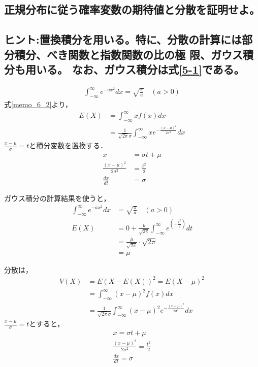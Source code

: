 \documentclass[titlepage,a4paper]{jsarticle}
\begin{document}
\subsection{正規分布に従う確率変数の期待値と分散を証明せよ。}
\subsection*{ヒント:置換積分を用いる。特に、分散の計算には部分積分、べき関数と指数関数の比の極 限、ガウス積分も用いる。
  なお、ガウス積分は式\eqref{5-1}である。}
\begin{align}
  \int_{-\infty}^\infty e^{-ax^2} dx = \sqrt{\frac{\pi}{a}} \quad (a > 0)\label{5-1}
\end{align}
式\eqref{memo_6_2}より，
\begin{align}
  E(X) & = \int_{-\infty}^\infty x f(x) dx                                                            \\
       & = \frac{1}{\sqrt{2\pi} \sigma} \int_{-\infty}^\infty x e^{-\frac{(x - \mu)^2}{2\sigma^2}} dx
\end{align}
$\frac{x - \mu}{\sigma} = t $と積分変数を置換する．
\begin{align}
  x                             & = \sigma t + \mu \\
  \frac{(x - \mu)^2}{2\sigma^2} & = \frac{t^2}{2}  \\
  \frac{dx}{dt}                 & = \sigma
\end{align}

ガウス積分の計算結果を使うと，
\begin{align}
  \int_{-\infty}^\infty e^{-ax^2} dx & = \sqrt{\frac{\pi}{a}} \quad (a > 0)                                                      \\
  E(X)                               & = 0 + \frac{\mu}{\sqrt{2\pi}} \int_{-\infty}^\infty e ^{\left( -\frac{t^2}{2} \right) }dt \\
                                     & = \frac{\mu}{\sqrt{2\pi}} \cdot \sqrt{2\pi}                                               \\
                                     & = \mu
\end{align}

分散は，
\begin{align}
  V(X) & = E(X - E(X))^2 = E(X - \mu)^2                                                                          \\
       & = \int_{-\infty}^\infty (x - \mu)^2 f(x) dx                                                             \\
       & = \frac{1}{\sqrt{2\pi} \sigma} \int_{-\infty}^\infty (x - \mu)^2 e^{-\frac{(x - \mu)^2}{2\sigma^2} } dx
\end{align}
$\frac{x - \mu}{\sigma} = t$とすると，
\begin{align}
  x = \sigma t + \mu                            \\
  \frac{(x - \mu)^2}{2\sigma^2} = \frac{t^2}{2} \\
  \frac{dx}{dt} = \sigma
\end{align}
\end{document}
